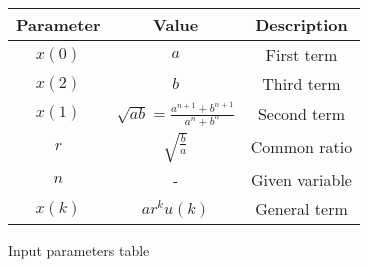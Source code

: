 \centering
\begin{tabular}{|c|c|c|}
        \hline
        \textbf{Parameter} & \textbf{Value} & \textbf{Description} \\
        \hline
	$x(0)$ & $a$ & First term \\
        \hline
	$x(2)$ & $b$ & Third term \\
	\hline
	$x(1)$ & $\sqrt{ab}=\frac{a^{n+1}+b^{n+1}}{a^{n}+b^{n}}$ & Second term\\
	\hline
	$r$ & $\sqrt{\frac{b}{a}}$ & Common ratio \\
	\hline
        $n$ & - & Given variable \\
        \hline
	$x(k)$ & $ar^{k}u(k)$ & General term \\
	\hline
\end{tabular}
\caption{Input parameters table}
\label{tab:1}
